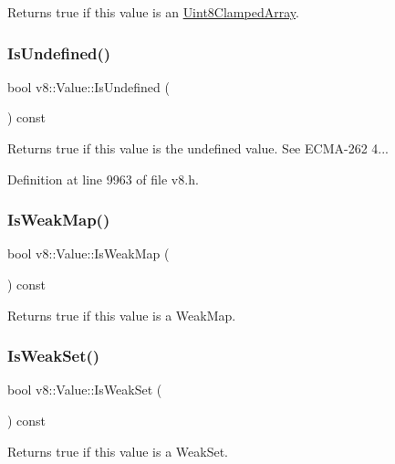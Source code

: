 Returns true if this value is an \mbox{\hyperlink{classv8_1_1Uint8ClampedArray}{Uint8\+Clamped\+Array}}. \mbox{\label{classv8_1_1Value_ad3a7686feef02fbe0317570b9640b078}} 
\subsubsection{\texorpdfstring{Is\+Undefined()}{IsUndefined()}}
{\footnotesize\ttfamily bool v8\+::\+Value\+::\+Is\+Undefined (\begin{DoxyParamCaption}{ }\end{DoxyParamCaption}) const}

Returns true if this value is the undefined value. See E\+C\+M\+A-\/262 4... 

Definition at line 9963 of file v8.\+h.

\mbox{\label{classv8_1_1Value_a3be1c8f103d9aa9b31b3b1c56905337d}} 
\subsubsection{\texorpdfstring{Is\+Weak\+Map()}{IsWeakMap()}}
{\footnotesize\ttfamily bool v8\+::\+Value\+::\+Is\+Weak\+Map (\begin{DoxyParamCaption}{ }\end{DoxyParamCaption}) const}

Returns true if this value is a Weak\+Map. \mbox{\label{classv8_1_1Value_a66c2dbb0ed13325f0f9e6b38e5e1992c}} 
\subsubsection{\texorpdfstring{Is\+Weak\+Set()}{IsWeakSet()}}
{\footnotesize\ttfamily bool v8\+::\+Value\+::\+Is\+Weak\+Set (\begin{DoxyParamCaption}{ }\end{DoxyParamCaption}) const}

Returns true if this value is a Weak\+Set. \mbox{\label{classv8_1_1Value_a3d7597e5cf475e73f127e2591d46bdf4}} 
